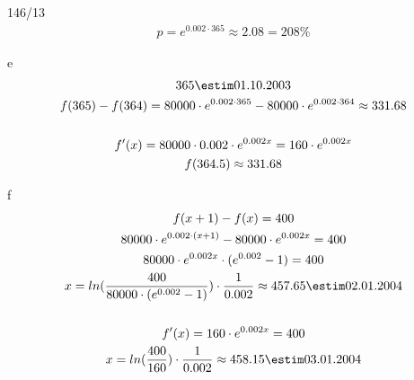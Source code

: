 \begin{exercise}{146/13}
\begin{gather*}
    p = e^{0.002 \cdot 365} \approx 2.08 = 208\%
  \end{gather*}
  \item [e]
  \begin{gather*}
    365 \estim 01.10.2003 \\
    f(365) - f(364) = 80000 \cdot e^{0.002 \cdot 365} - 80000 \cdot e^{0.002 \cdot 364} \approx 331.68 \\\\
    f'(x) = 80000 \cdot 0.002 \cdot e^{0.002x} = 160 \cdot e^{0.002x} \\
    f(364.5) \approx 331.68
  \end{gather*}
  \item [f]
  \begin{gather*}
    f(x + 1) - f(x) = 400 \\
    80000 \cdot e^{0.002 \cdot (x + 1)} - 80000 \cdot e^{0.002x} = 400 \\
    80000 \cdot e^{0.002x} \cdot (e^{0.002} - 1) = 400 \\
    x = ln(\frac{400}{80000 \cdot (e^{0.002} - 1)}) \cdot \frac{1}{0.002} \approx 457.65 \estim 02.01.2004 \\\\
    f'(x) = 160 \cdot e^{0.002x} = 400 \\
    x = ln(\frac{400}{160}) \cdot \frac{1}{0.002} \approx 458.15 \estim 03.01.2004
  \end{gather*}
\end{exercise}
\newpage
